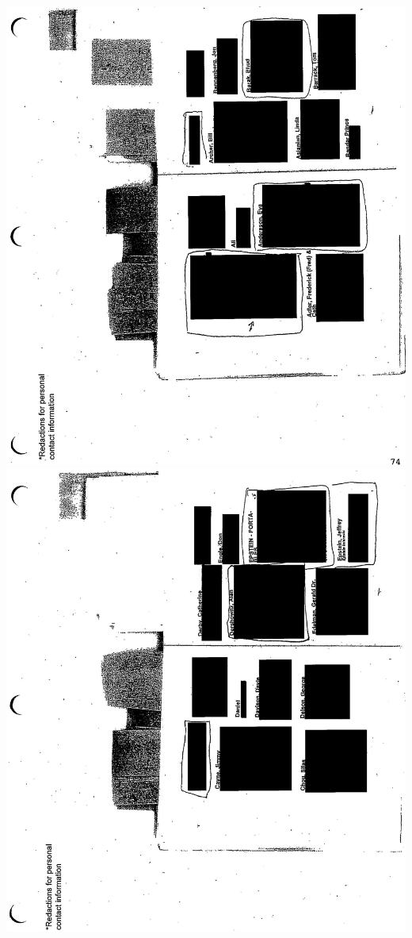 \documentclass[10pt]{article}
\begin{document}
\includegraphics[max width=\textwidth, center]{2025_02_27_dd68c3d38de88f0516d9g-191}\\
\includegraphics[max width=\textwidth, center]{2025_02_27_dd68c3d38de88f0516d9g-193}\\
\end{document}

